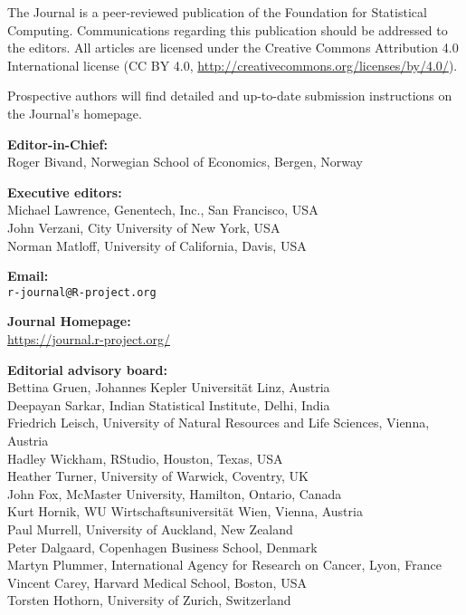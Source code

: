 \documentclass[a4paper]{report}
\begin{document}
\sectionhead{}

\titlepage

\vspace*{1in}
\begin{center}
\begin{minipage}{0.65\textwidth}
    \begin{center}
    The \R{} Journal is a peer-reviewed publication of
    the \R{} Foundation for Statistical Computing. Communications
    regarding this publication should be addressed to the editors. All
    articles are licensed under the Creative Commons Attribution 4.0
    International license (CC BY 4.0, \url{http://creativecommons.org/licenses/by/4.0/}).
    \bigskip

    Prospective authors will find detailed and up-to-date submission
    instructions on the Journal's homepage.

    \bigskip
      \textbf{Editor-in-Chief:}\\
      Roger Bivand, Norwegian School of Economics, Bergen, Norway

    \bigskip
      \textbf{Executive editors:}\\
      Michael Lawrence, Genentech, Inc., San Francisco, USA\\
      John Verzani, City University of New York, USA\\
      Norman Matloff, University of California, Davis, USA

    \bigskip
    \textbf{Email:}\\
    \texttt{r-journal@R-project.org}

    \bigskip
    \textbf{\R{} Journal Homepage:}\\
    \url{https://journal.r-project.org/}

    \bigskip
      \textbf{Editorial advisory board:}\\
      Bettina Gruen, Johannes Kepler Universität Linz, Austria\\
      Deepayan Sarkar, Indian Statistical Institute, Delhi, India\\
      Friedrich Leisch, University of Natural Resources and Life Sciences,
      Vienna, Austria\\
      Hadley Wickham, RStudio, Houston, Texas, USA\\
      Heather Turner, University of Warwick, Coventry, UK\\
      John Fox, McMaster University, Hamilton, Ontario, Canada\\
      Kurt Hornik, WU Wirtschaftsuniversität Wien, Vienna, Austria\\
      Paul Murrell, University of Auckland, New Zealand\\
      Peter Dalgaard, Copenhagen Business School, Denmark\\
      Martyn Plummer, International Agency for Research on Cancer, Lyon, France\\
      Vincent Carey, Harvard Medical School, Boston, USA\\
      Torsten Hothorn, University of Zurich, Switzerland


\end{center}
\end{minipage}
\end{center}
\end{document}
